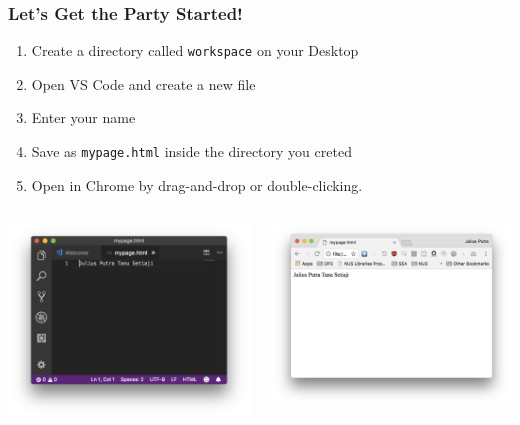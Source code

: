 \documentclass[12pt]{beamer}
\begin{document}
\begin{frame}
\frametitle{Let's Get the Party Started!}
\begin{enumerate}
	\item Create a directory called \texttt{workspace} on your Desktop
	\item Open VS Code and create a new file
	\item Enter your name
	\item Save as \texttt{mypage.html} inside the directory you creted
	\item Open in Chrome by drag-and-drop or double-clicking.
\end{enumerate}
\begin{columns}
	\begin{column}{0.5\linewidth}
		\includegraphics[width=\linewidth]{vscode-newfile}
	\end{column}
	\begin{column}{0.5\linewidth}
		\includegraphics[width=\linewidth]{chrome-newfile}
	\end{column}
\end{columns}
\end{frame}
\end{document}
